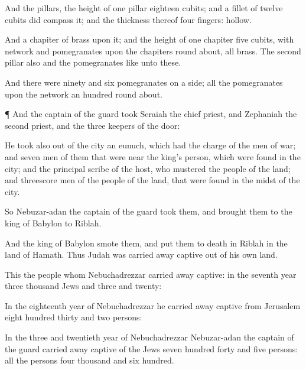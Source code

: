 {And
{} the
pillars, the
height of
one
pillar
{}
eighteen
cubits; and a
fillet of
twelve
cubits did
compass it; and the
thickness thereof
{}
four
fingers:
{}
hollow.

And a
chapiter of
brass
{} upon it; and the
height of
one
chapiter
{}
five
cubits, with
network and
pomegranates upon the
chapiters round
about, all
{}
brass. The
second
pillar also and the
pomegranates
{} like unto these.

And there were
ninety and
six
pomegranates on a
side;
{} all the
pomegranates upon the
network
{} an
hundred round
about.


\par }{\PP {}¶ And the
captain of the
guard
took
Seraiah the
chief
priest, and
Zephaniah the
second
priest, and the
three
keepers of the
door:

He
took also out of the
city
an
eunuch, which had the
charge of the
men of
war; and
seven
men of them that were
near the
king’s
person, which were
found in the
city; and the
principal
scribe of the
host, who
mustered the
people of the
land; and
threescore
men of the
people of the
land, that were
found in the
midst of the
city.

So
Nebuzar-adan the
captain of the
guard
took them, and
brought them to the
king of
Babylon to
Riblah.

And the
king of
Babylon
smote them, and put them to
death in
Riblah in the
land of
Hamath. Thus
Judah was carried away
captive out of his own
land.

This
{} the
people whom
Nebuchadrezzar carried away
captive: in the
seventh
year
three
thousand
Jews and
three and
twenty:

In the
eighteenth
year of
Nebuchadrezzar he carried away
captive from
Jerusalem
eight
hundred
thirty and
two
persons:

In the
three and
twentieth
year of
Nebuchadrezzar
Nebuzar-adan the
captain of the
guard carried away
captive of the
Jews
seven
hundred
forty and
five
persons: all the
persons
{}
four
thousand and
six
hundred.


}
